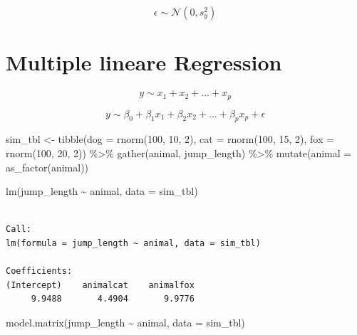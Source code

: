 \documentclass[
  letterpaper,
  DIV=11,
  oneside]{scrreport}
\newenvironment{Shaded}{\begin{snugshade}}{\end{snugshade}}
\newcommand{\AttributeTok}[1]{\textcolor[rgb]{0.40,0.45,0.13}{#1}}
\newcommand{\DecValTok}[1]{\textcolor[rgb]{0.68,0.00,0.00}{#1}}
\newcommand{\FunctionTok}[1]{\textcolor[rgb]{0.28,0.35,0.67}{#1}}
\newcommand{\NormalTok}[1]{\textcolor[rgb]{0.00,0.23,0.31}{#1}}
\newcommand{\OtherTok}[1]{\textcolor[rgb]{0.00,0.23,0.31}{#1}}
\newcommand{\SpecialCharTok}[1]{\textcolor[rgb]{0.37,0.37,0.37}{#1}}
\begin{document}
\[
\epsilon \sim \mathcal{N}(0, s^2_y)
\]

\hypertarget{multiple-lineare-regression}{%
\section*{Multiple lineare
Regression}\label{multiple-lineare-regression}}

\[
y \sim x_1 + x_2 + ... + x_p
\]

\[
y \sim \beta_0 + \beta_1 x_1 + \beta_2 x_2 + ... + \beta_p x_p + \epsilon
\]

\begin{Shaded}
\begin{Highlighting}[]
\NormalTok{sim\_tbl }\OtherTok{\textless{}{-}} \FunctionTok{tibble}\NormalTok{(}\AttributeTok{dog =} \FunctionTok{rnorm}\NormalTok{(}\DecValTok{100}\NormalTok{, }\DecValTok{10}\NormalTok{, }\DecValTok{2}\NormalTok{),}
                  \AttributeTok{cat =} \FunctionTok{rnorm}\NormalTok{(}\DecValTok{100}\NormalTok{, }\DecValTok{15}\NormalTok{, }\DecValTok{2}\NormalTok{),}
                  \AttributeTok{fox =} \FunctionTok{rnorm}\NormalTok{(}\DecValTok{100}\NormalTok{, }\DecValTok{20}\NormalTok{, }\DecValTok{2}\NormalTok{)) }\SpecialCharTok{\%\textgreater{}\%} 
  \FunctionTok{gather}\NormalTok{(animal, jump\_length) }\SpecialCharTok{\%\textgreater{}\%} 
  \FunctionTok{mutate}\NormalTok{(}\AttributeTok{animal =} \FunctionTok{as\_factor}\NormalTok{(animal))}

\FunctionTok{lm}\NormalTok{(jump\_length }\SpecialCharTok{\textasciitilde{}}\NormalTok{ animal, }\AttributeTok{data =}\NormalTok{ sim\_tbl)}
\end{Highlighting}
\end{Shaded}

\begin{verbatim}

Call:
lm(formula = jump_length ~ animal, data = sim_tbl)

Coefficients:
(Intercept)    animalcat    animalfox  
     9.9488       4.4904       9.9776  
\end{verbatim}

\begin{Shaded}
\begin{Highlighting}[]
\FunctionTok{model.matrix}\NormalTok{(jump\_length }\SpecialCharTok{\textasciitilde{}}\NormalTok{ animal, }\AttributeTok{data =}\NormalTok{ sim\_tbl)}
\end{Highlighting}
\end{Shaded}
\end{document}
